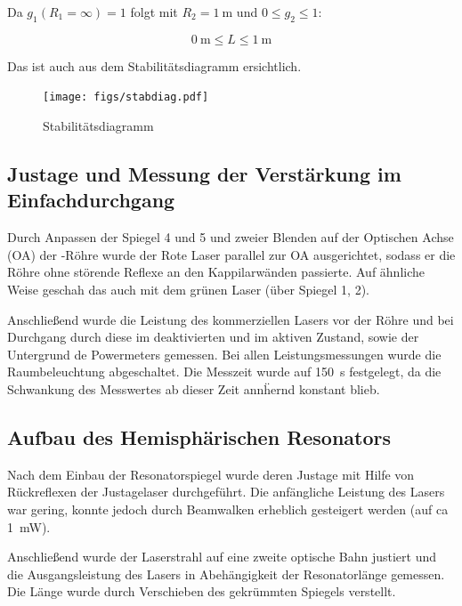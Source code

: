 \documentclass[slug=GL, room=HZDR\ Dresden/Rossendorf\,\ Geb.\ 620/123, supervisor=Martin\ Rehwald;\, Tim\ Ziegler]{../../Lab_Report_LaTeX/lab_report}
\begin{document}
Da \(g_1(R_1=\infty)=1\) folgt mit \(R_2=\SI{1}{\meter}\) und \(0\leq g_2\leq 1\):

\begin{equation}
  \label{eq:stabber}
  \SI{0}{\meter}\leq L \leq \SI{1}{\meter}
\end{equation}

Das ist auch aus dem Stabilit\"atsdiagramm ersichtlich.
\begin{figure}[H]\centering
  \texttt{[image: figs/stabdiag.pdf]}
  \caption[Gauss]{Stabilit\"atsdiagramm}
  \label{fig:stabdiag}
\end{figure}

\subsection{Justage und Messung der Verst\"arkung im Einfachdurchgang}
\label{sec:justage}

Durch Anpassen der Spiegel 4 und 5 und zweier Blenden auf der
Optischen Achse (OA) der -R\"ohre wurde der Rote Laser
parallel zur OA ausgerichtet, sodass er die R\"ohre ohne st\"orende
Reflexe an den Kappilarw\"anden passierte. Auf \"ahnliche Weise
geschah das auch mit dem gr\"unen Laser (\"uber Spiegel 1, 2).

Anschlie\ss{}end wurde die Leistung des kommerziellen Lasers vor der
R\"ohre und bei Durchgang durch diese im deaktivierten und im aktiven
Zustand, sowie der Untergrund de Powermeters gemessen. Bei allen
Leistungsmessungen wurde die Raumbeleuchtung abgeschaltet. Die
Messzeit wurde auf \SI{150}{\second} festgelegt, da die Schwankung
des Messwertes ab dieser Zeit ann\"hernd konstant blieb.

\subsection{Aufbau des Hemisph\"arischen Resonators}
\label{sec:aufbauhemi}

Nach dem Einbau der Resonatorspiegel wurde deren Justage mit Hilfe von
R\"uckreflexen der Justagelaser durchgef\"uhrt. Die anf\"angliche
Leistung des Lasers war gering, konnte jedoch durch Beamwalken
erheblich gesteigert werden (auf ca \SI{1}{\milli\watt}).

Anschlie\ss{}end wurde der Laserstrahl auf eine zweite optische Bahn
justiert und die Ausgangsleistung des Lasers in Abeh\"angigkeit der
Resonatorl\"ange gemessen. Die L\"ange wurde durch Verschieben des
gekr\"ummten Spiegels verstellt.
\end{document}
